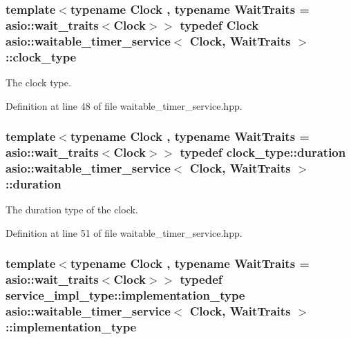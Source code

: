 \subsubsection[{clock\+\_\+type}]{\setlength{\rightskip}{0pt plus 5cm}template$<$typename Clock , typename Wait\+Traits  = asio\+::wait\+\_\+traits$<$\+Clock$>$$>$ typedef Clock {\bf asio\+::waitable\+\_\+timer\+\_\+service}$<$ Clock, Wait\+Traits $>$\+::{\bf clock\+\_\+type}}\label{classasio_1_1waitable__timer__service_a39c2c82bad766b47c23abf56738392e7}


The clock type. 



Definition at line 48 of file waitable\+\_\+timer\+\_\+service.\+hpp.

\hypertarget{classasio_1_1waitable__timer__service_a5ac45e701365614edd95291c94729ce4}{}
\subsubsection[{duration}]{\setlength{\rightskip}{0pt plus 5cm}template$<$typename Clock , typename Wait\+Traits  = asio\+::wait\+\_\+traits$<$\+Clock$>$$>$ typedef clock\+\_\+type\+::duration {\bf asio\+::waitable\+\_\+timer\+\_\+service}$<$ Clock, Wait\+Traits $>$\+::{\bf duration}}\label{classasio_1_1waitable__timer__service_a5ac45e701365614edd95291c94729ce4}


The duration type of the clock. 



Definition at line 51 of file waitable\+\_\+timer\+\_\+service.\+hpp.

\hypertarget{classasio_1_1waitable__timer__service_a397aa07a3c8f707a307b83a9616ed44e}{}
\subsubsection[{implementation\+\_\+type}]{\setlength{\rightskip}{0pt plus 5cm}template$<$typename Clock , typename Wait\+Traits  = asio\+::wait\+\_\+traits$<$\+Clock$>$$>$ typedef service\+\_\+impl\+\_\+type\+::implementation\+\_\+type {\bf asio\+::waitable\+\_\+timer\+\_\+service}$<$ Clock, Wait\+Traits $>$\+::{\bf implementation\+\_\+type}}\label{classasio_1_1waitable__timer__service_a397aa07a3c8f707a307b83a9616ed44e}


